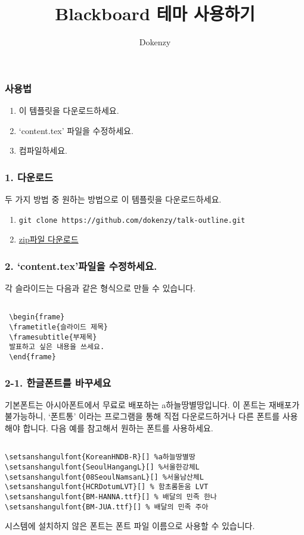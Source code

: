 


\author{Dokenzy}
\date{\vspace{-1em}}
\title{Blackboard 테마 사용하기}


\maketitle

\begin{frame}[fragile]
\frametitle{사용법}
\begin{enumerate}
\item 이 템플릿을 다운로드하세요.
\item `content.tex' 파일을 수정하세요.
\item 컴파일하세요.
\end{enumerate}
\end{frame}


\begin{frame}[fragile]
\frametitle{1. 다운로드}
두 가지 방법 중 원하는 방법으로 이 템플릿을 다운로드하세요.
\begin{enumerate}
\item \lstinline|git clone https://github.com/dokenzy/talk-outline.git|
\item \href{https://github.com/dokenzy/talk-outline/archive/master.zip}{zip파일 다운로드}
\end{enumerate}
\end{frame}


\begin{frame}[fragile]
\frametitle{2. `content.tex'파일을 수정하세요.}
각 슬라이드는 다음과 같은 형식으로 만들 수 있습니다.
\begin{lstlisting}

 \begin{frame}
 \frametitle{슬라이드 제목}
 \framesubtitle{부제목}
 발표하고 싶은 내용을 쓰세요.
 \end{frame}

\end{lstlisting}
\end{frame}


\begin{frame}[fragile]
\frametitle{2-1. 한글폰트를 바꾸세요}
기본폰트는 아시아폰트에서 무료로 배포하는 a하늘땅별땅입니다. 이 폰트는 재배포가 불가능하니, `폰트통' 이라는 프로그램을 통해 직접 다운로드하거나 다른 폰트를 사용해야 합니다. 다음 예를 참고해서 원하는 폰트를 사용하세요.
\begin{lstlisting}

\setsanshangulfont{KoreanHNDB-R}[] %a하늘땅별땅
\setsanshangulfont{SeoulHangangL}[] %서울한강체L
\setsanshangulfont{08SeoulNamsanL}[] %서울남산체L
\setsanshangulfont{HCRDotumLVT}[] % 함초롬돋움 LVT
\setsanshangulfont{BM-HANNA.ttf}[] % 배달의 민족 한나
\setsanshangulfont{BM-JUA.ttf}[] % 배달의 민족 주아

\end{lstlisting}
시스템에 설치하지 않은 폰트는 폰트 파일 이름으로 사용할 수 있습니다.
\end{frame}


